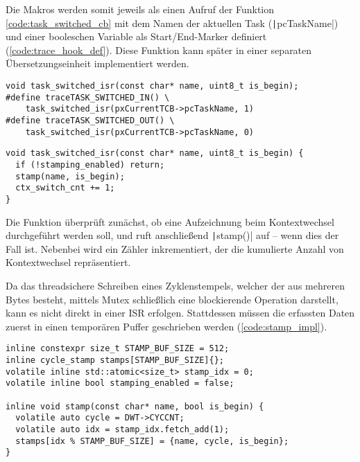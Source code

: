 Die Makros werden somit jeweils als einen Aufruf der Funktion
\ref{code:task_switched_cb} mit dem Namen der aktuellen Task
(\texttt|pcTaskName|) und einer booleschen Variable als
Start/End-Marker definiert (\ref{code:trace_hook_def}). Diese Funktion kann
später in einer separaten Übersetzungseinheit implementiert werden.

\begin{code}
\begin{verbatim}
void task_switched_isr(const char* name, uint8_t is_begin);
#define traceTASK_SWITCHED_IN() \
    task_switched_isr(pxCurrentTCB->pcTaskName, 1)
#define traceTASK_SWITCHED_OUT() \
    task_switched_isr(pxCurrentTCB->pcTaskName, 0)
\end{verbatim}
    \label{code:trace_hook_def}
\end{code}

\begin{code}
\begin{verbatim}
void task_switched_isr(const char* name, uint8_t is_begin) {
  if (!stamping_enabled) return;
  stamp(name, is_begin);
  ctx_switch_cnt += 1;
}
\end{verbatim}
    \label{code:task_switched_cb}
\end{code}

Die Funktion überprüft zunächst, ob eine Aufzeichnung beim Kontextwechsel
durchgeführt werden soll, und ruft anschließend \texttt|stamp()| auf --
wenn dies der Fall ist. Nebenbei wird ein Zähler inkrementiert, der die
kumulierte Anzahl von Kontextwechsel repräsentiert.

Da das threadsichere Schreiben eines Zyklenstempels, welcher der aus mehreren
Bytes besteht, mittels Mutex schließlich eine blockierende Operation darstellt,
kann es nicht direkt in einer ISR erfolgen. Stattdessen müssen die erfassten
Daten zuerst in einen temporären Puffer geschrieben werden
(\ref{code:stamp_impl}).

\begin{code}
\begin{verbatim}
inline constexpr size_t STAMP_BUF_SIZE = 512;
inline cycle_stamp stamps[STAMP_BUF_SIZE]{};
volatile inline std::atomic<size_t> stamp_idx = 0;
volatile inline bool stamping_enabled = false;

inline void stamp(const char* name, bool is_begin) {
  volatile auto cycle = DWT->CYCCNT;
  volatile auto idx = stamp_idx.fetch_add(1);
  stamps[idx % STAMP_BUF_SIZE] = {name, cycle, is_begin};
}
\end{verbatim}
    \label{code:stamp_impl}
\end{code}


